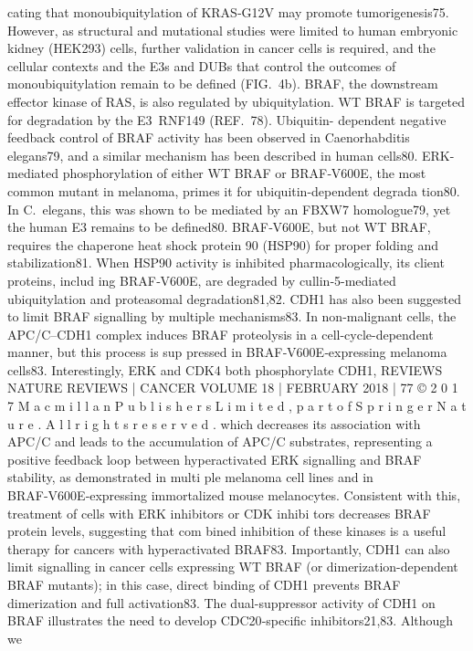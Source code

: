cating that monoubiquitylation of KRAS‑G12V may
promote tumorigenesis75. However, as structural and
mutational studies were limited to human embryonic
kidney (HEK293) cells, further validation in cancer cells
is required, and the cellular contexts and the E3s and
DUBs that control the outcomes of monoubiquitylation
remain to be defined (FIG. 4b).
BRAF, the downstream effector kinase of RAS, is
also regulated by ubiquitylation. WT BRAF is targeted
for degradation by the E3 RNF149 (REF. 78). Ubiquitin-
dependent negative feedback control of BRAF activity
has been observed in Caenorhabditis elegans79, and
a similar mechanism has been described in human
cells80. ERK-mediated phosphorylation of either WT
BRAF or BRAF‑V600E, the most common mutant in
melanoma, primes it for ubiquitin-dependent degrada­
tion80. In C. elegans, this was shown to be mediated by
an FBXW7 homologue79, yet the human E3 remains to
be defined80. BRAF‑V600E, but not WT BRAF, requires
the chaperone heat shock protein 90 (HSP90) for proper
folding and stabilization81. When HSP90 activity is
inhibited pharmacologically, its client proteins, includ­
ing BRAF‑V600E, are degraded by cullin‑5-­mediated
ubiquitylation and proteasomal degradation81,82. CDH1
has also been suggested to limit BRAF signalling by
multiple mechanisms83. In non-malignant cells, the
APC/C–CDH1 complex induces BRAF proteolysis in
a cell-cycle-dependent manner, but this process is sup­
pressed in BRAF‑V600E‑expressing melanoma cells83.
Interestingly, ERK and CDK4 both phosphorylate CDH1,
REVIEWS
NATURE REVIEWS | CANCER
 VOLUME 18 | FEBRUARY 2018 | 77
©
 2
0
1
7
 M
a
c
m
i
l
l
a
n
 P
u
b
l
i
s
h
e
r
s
 L
i
m
i
t
e
d
,
 p
a
r
t
 o
f
 S
p
r
i
n
g
e
r
 N
a
t
u
r
e
.
 A
l
l
 r
i
g
h
t
s
 r
e
s
e
r
v
e
d
.
which decreases its association with APC/C and leads
to the accumulation of APC/C substrates, representing
a positive feedback loop between hyperactivated ERK
signalling and BRAF stability, as demonstrated in multi­
ple melanoma cell lines and in BRAF‑V600E‑expressing
immortalized mouse melanocytes. Consistent with this,
treatment of cells with ERK inhibitors or CDK inhibi­
tors decreases BRAF protein levels, suggesting that com­
bined inhibition of these kinases is a useful therapy for
­cancers with hyperactivated BRAF83. Importantly, CDH1
can also limit signalling in cancer cells expressing WT
BRAF (or dimerization-dependent BRAF mutants);
in this case, direct binding of CDH1 prevents BRAF
dimerization and full activation83. The dual-­suppressor
activity of CDH1 on BRAF illustrates the need to
develop CDC20‑specific inhibitors21,83. Although we
